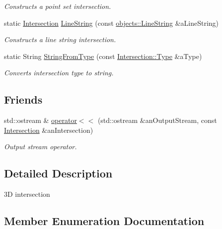 \begin{DoxyCompactItemize}
\begin{DoxyCompactList}\small\item\em Constructs a point set intersection. \end{DoxyCompactList}\item 
static \hyperlink{classlibrary_1_1math_1_1geom_1_1d3_1_1_intersection}{Intersection} \hyperlink{classlibrary_1_1math_1_1geom_1_1d3_1_1_intersection_aa546d0185512a4c093a705a4c96f8960}{Line\+String} (const \hyperlink{classlibrary_1_1math_1_1geom_1_1d3_1_1objects_1_1_line_string}{objects\+::\+Line\+String} \&a\+Line\+String)
\begin{DoxyCompactList}\small\item\em Constructs a line string intersection. \end{DoxyCompactList}\item 
static String \hyperlink{classlibrary_1_1math_1_1geom_1_1d3_1_1_intersection_a7294c6aa40d2353f1f4d7d6019c9dbdc}{String\+From\+Type} (const \hyperlink{classlibrary_1_1math_1_1geom_1_1d3_1_1_intersection_a3465d607fd42380f350598e055271b05}{Intersection\+::\+Type} \&a\+Type)
\begin{DoxyCompactList}\small\item\em Converts intersection type to string. \end{DoxyCompactList}\end{DoxyCompactItemize}
\subsection*{Friends}
\begin{DoxyCompactItemize}
\item 
std\+::ostream \& \hyperlink{classlibrary_1_1math_1_1geom_1_1d3_1_1_intersection_a8ff783039001be6a871338148f4f2919}{operator$<$$<$} (std\+::ostream \&an\+Output\+Stream, const \hyperlink{classlibrary_1_1math_1_1geom_1_1d3_1_1_intersection}{Intersection} \&an\+Intersection)
\begin{DoxyCompactList}\small\item\em Output stream operator. \end{DoxyCompactList}\end{DoxyCompactItemize}


\subsection{Detailed Description}
3D intersection 

\subsection{Member Enumeration Documentation}
\mbox{\label{classlibrary_1_1math_1_1geom_1_1d3_1_1_intersection_a3465d607fd42380f350598e055271b05}} 
